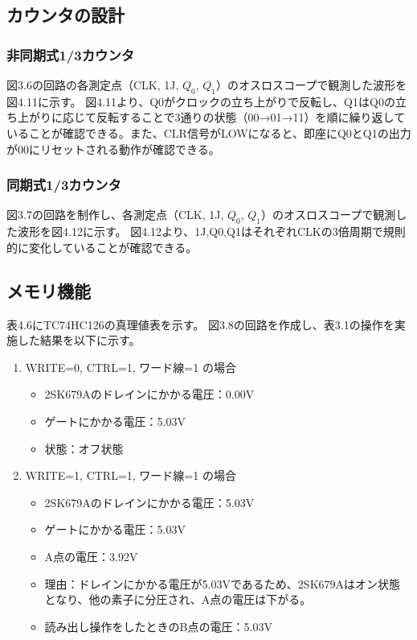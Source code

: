 \documentclass{jlreq}
\numberwithin{equation}{section}
\begin{document}
\subsection{カウンタの設計}
\subsubsection{非同期式1/3カウンタ}
図3.6の回路の各測定点（CLK, 1J, \(Q_0\), \(Q_1\)）のオスロスコープで観測した波形を図4.11に示す。
図4.11より、Q0がクロックの立ち上がりで反転し、Q1はQ0の立ち上がりに応じて反転することで3通りの状態（00→01→11）を順に繰り返していることが確認できる。また、CLR信号がLOWになると、即座にQ0とQ1の出力が00にリセットされる動作が確認できる。

\subsubsection{同期式1/3カウンタ}
図3.7の回路を制作し、各測定点（CLK, 1J, \(Q_0\), \(Q_1\)）のオスロスコープで観測した波形を図4.12に示す。
図4.12より、1J,Q0,Q1はそれぞれCLKの3倍周期で規則的に変化していることが確認できる。

\subsection{メモリ機能}
表4.6にTC74HC126の真理値表を示す。
図3.8の回路を作成し、表3.1の操作を実施した結果を以下に示す。
\begin{enumerate}
  \item WRITE=0, CTRL=1, ワード線=1 の場合
  \begin{itemize}
    \item 2SK679Aのドレインにかかる電圧：0.00V
    \item ゲートにかかる電圧：5.03V
    \item 状態：オフ状態
  \end{itemize}
  \item WRITE=1, CTRL=1, ワード線=1 の場合
  \begin{itemize}
    \item 2SK679Aのドレインにかかる電圧：5.03V
    \item ゲートにかかる電圧：5.03V
    \item A点の電圧：3.92V
    \item 理由：ドレインにかかる電圧が5.03Vであるため、2SK679Aはオン状態となり、他の素子に分圧され、A点の電圧は下がる。
    \item 読み出し操作をしたときのB点の電圧：5.03V
  \end{itemize}
\end{enumerate}
\end{document}
